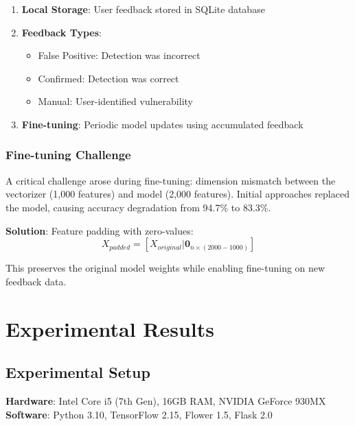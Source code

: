 \documentclass[conference]{IEEEtran}
\begin{document}
\begin{enumerate}
    \item \textbf{Local Storage}: User feedback stored in SQLite database
    \item \textbf{Feedback Types}: 
    \begin{itemize}
        \item False Positive: Detection was incorrect
        \item Confirmed: Detection was correct
        \item Manual: User-identified vulnerability
    \end{itemize}
    \item \textbf{Fine-tuning}: Periodic model updates using accumulated feedback
\end{enumerate}

\subsubsection{Fine-tuning Challenge}

A critical challenge arose during fine-tuning: dimension mismatch between the vectorizer (1,000 features) and model (2,000 features). Initial approaches replaced the model, causing accuracy degradation from 94.7\% to 83.3\%.

\textbf{Solution}: Feature padding with zero-values:
\begin{equation}
    X_{padded} = [X_{original} | \mathbf{0}_{n \times (2000 - 1000)}]
\end{equation}

This preserves the original model weights while enabling fine-tuning on new feedback data.

\section{Experimental Results}

\subsection{Experimental Setup}

\textbf{Hardware}: Intel Core i5 (7th Gen), 16GB RAM, NVIDIA GeForce 930MX \\
\textbf{Software}: Python 3.10, TensorFlow 2.15, Flower 1.5, Flask 2.0
\end{document}
